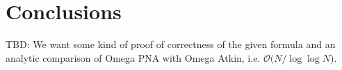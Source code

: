 \documentclass{article}
\begin{document}


\section{Conclusions}\label{conclusions}
TBD: We want some kind of proof of correctness of the given formula and an analytic comparison of Omega PNA with Omega Atkin, i.e. $\mathcal{O}(N/\log \log N$).


\end{document}
